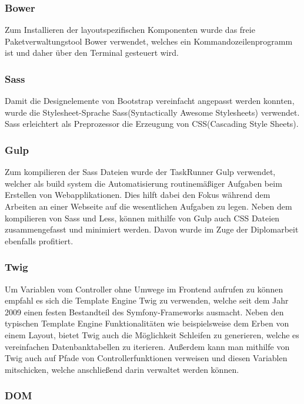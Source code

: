     \subsubsection{Bower}

	Zum Installieren der layoutspezifischen Komponenten wurde das freie Paketverwaltungstool Bower verwendet, welches ein Kommandozeilenprogramm ist und daher über den Terminal gesteuert wird.

    \subsubsection{Sass}

	Damit die Designelemente von Bootstrap vereinfacht angepasst werden konnten, wurde die Stylesheet-Sprache Sass(Syntactically Awesome Stylesheets) verwendet. Sass erleichtert als Preprozessor die Erzeugung von CSS(Cascading Style Sheets).

    \subsubsection{Gulp}

	Zum kompilieren der Sass Dateien wurde der TaskRunner Gulp verwendet, welcher als build system die Automatisierung routinemäßiger Aufgaben beim Erstellen von Webapplikationen. Dies hilft dabei den Fokus während dem Arbeiten an einer Webseite auf die wesentlichen Aufgaben zu legen. Neben dem kompilieren von Sass und Less, können mithilfe von Gulp auch CSS Dateien zusammengefasst und minimiert werden. Davon wurde im Zuge der Diplomarbeit ebenfalls profitiert.

    \subsubsection{Twig}

	Um Variablen vom Controller ohne Umwege im Frontend aufrufen zu können empfahl es sich die Template Engine Twig zu verwenden, welche seit dem Jahr 2009 einen festen Bestandteil des Symfony-Frameworks ausmacht. Neben den typischen Template Engine Funktionalitäten wie beispielsweise dem Erben von einem Layout, bietet Twig auch die Möglichkeit Schleifen zu generieren, welche es vereinfachen Datenbanktabellen zu iterieren. Außerdem kann man mithilfe von Twig auch auf Pfade von Controllerfunktionen verweisen und diesen Variablen mitschicken, welche anschließend darin verwaltet werden können.

    
    \subsubsection{DOM}

